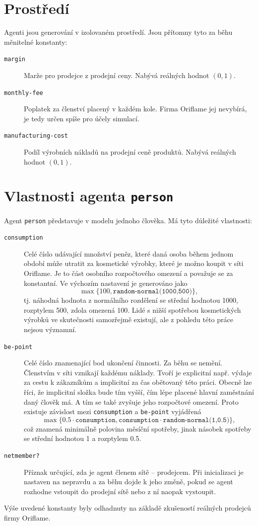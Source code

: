 \documentclass[a4wide,12pt]{report}
\begin{document}
\section{Prostředí}
Agenti jsou generování v izolovaném prostředí. Jsou přítomny tyto za běhu měnitelné konstanty:
\begin{description}
\item[\texttt{margin}] Marže pro prodejce z prodejní ceny. Nabývá reálných hodnot $(0,1)$.
\item[\texttt{monthly-fee}] Poplatek za členství placený v každém kole. Firma Oriflame jej nevybírá, je tedy určen spíše pro účely simulací.
\item[\texttt{manufacturing-cost}] Podíl výrobních nákladů na prodejní ceně produktů. Nabývá reálných hodnot $(0,1)$.
\end{description}
\section{Vlastnosti agenta \texttt{person}}
\label{sec:vl_agenta}
Agent \texttt{person} představuje v modelu jednoho člověka. Má tyto důležité vlastnosti:
\begin{description}
\item[\texttt{consumption}] Celé číslo udávající množství peněz, které daná osoba během jednom období může utratit za kosmetické výrobky, které je možno koupit v síti Oriflame. Je to část osobního rozpočtového omezení a považuje se za konstantní. Ve výchozím nastavení je generováno jako
$$\max\{100,\texttt{random-normal(1000,500)}\},$$
tj. náhodná hodnota z normálního rozdělení se střední hodnotou 1000, rozptylem 500, zdola omezená 100. Lidé s nižší spotřebou kosmetických výrobků ve skutečnosti samozřejmě existují, ale z pohledu této práce nejsou významní.
\item[\texttt{be-point}] Celé číslo znamenající bod ukončení činnosti. Za běhu se nemění. Členstvím v síti vznikají každému náklady. Tvoří je explicitní např. výdaje za cestu k zákazníkům a implicitní za čas obětovaný této práci. Obecně lze říci, že implicitní složka bude tím vyš\-ší, čím lépe placené hlavní zaměstnání daný člověk má. A tím se také zvyšuje jeho rozpočtové omezení. Proto existuje závislost mezi \texttt{consumption} a \texttt{be-point} vyjádřená
$$\max\{0.5\cdot\texttt{consumption},\texttt{consumption}\cdot\texttt{random-normal(1,0.5)}\},$$
což znamená minimálně polovina měsíční spotřeby, jinak násobek spotřeby se střední hodnotou 1 a rozptylem 0.5.
\item[\texttt{netmember?}] Příznak určující, zda je agent členem sítě -- prodejcem. Při inicializaci je nastaven na nepravdu a za běhu dojde k jeho změně, pokud se agent rozhodne vstoupit do prodejní sítě nebo z ní naopak vystoupit.
\end{description}
Výše uvedené konstanty byly odhadnuty na základě zkušeností reálných prodejců firmy Oriflame.
\end{document}
